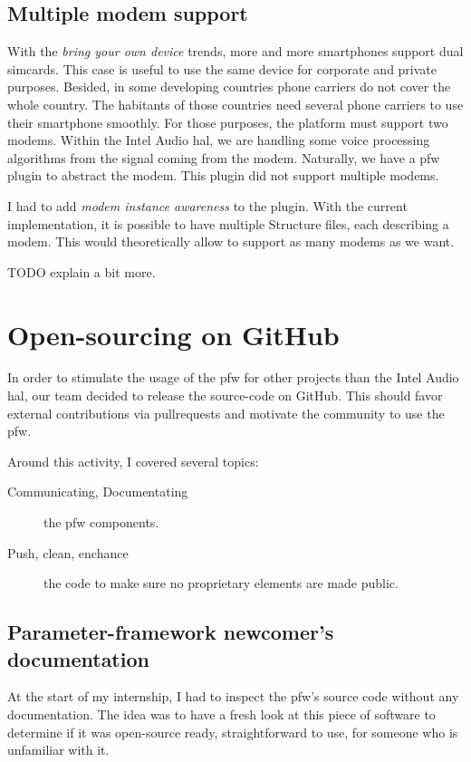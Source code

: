\subsection{Multiple modem support}
With the \emph{bring your own device} trends, more and more smartphones support dual simcards. This case
is useful to use the same device for corporate and private purposes.
Besided, in some developing countries phone carriers do not cover the whole country. The habitants of those
countries need several phone carriers to use their smartphone smoothly.
For those purposes, the platform must support two modems.
Within the Intel Audio \gls{hal}, we are handling some voice processing algorithms from the signal coming from the modem.
Naturally, we have a \gls{pfw} plugin to abstract the modem. This plugin did not support multiple modems.

I had to add \emph{modem instance awareness} to the plugin. With the current implementation, it
is possible to have multiple Structure files, each describing a modem. This would theoretically allow
to support as many modems as we want.

TODO explain a bit more.

\section{Open-sourcing on GitHub}
In order to stimulate the usage of the \gls{pfw} for other projects than the Intel Audio \gls{hal},
our team decided to release the source-code on \gls{GitHub}.
This should favor external contributions via \gls{pullrequests} and motivate
the community to use the \gls{pfw}.

Around this activity, I covered several topics:
\begin{description}
    \item[Communicating, Documentating] the \gls{pfw} components.
    \item[Push, clean, enchance] the code to make sure no proprietary
        elements are made public.
\end{description}

\subsection{Parameter-framework newcomer's documentation}\label{sec:tutorials}

At the start of my internship, I had to inspect the \gls{pfw}'s
source code without any documentation. The idea was to have a fresh look at
this piece of software to determine if it was open-source ready, straightforward
to use, for someone who is unfamiliar with it.

